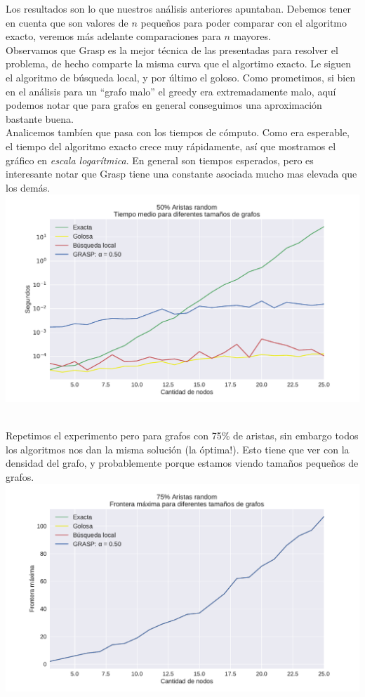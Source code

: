 Los resultados son lo que nuestros análisis anteriores apuntaban. Debemos tener en cuenta que son valores de $n$ pequeños para poder comparar con el algoritmo exacto, veremos más adelante comparaciones para $n$ mayores. \\

Observamos que Grasp es la mejor técnica de las presentadas para resolver el problema, de hecho comparte la misma curva que el algortimo exacto. Le siguen el algoritmo de búsqueda local, y por último el goloso. Como prometimos, si bien en el análisis para un ``grafo malo'' el greedy era extremadamente malo, aquí podemos notar que para grafos en general conseguimos una aproximación bastante buena. \\

Analicemos tambíen que pasa con los tiempos de cómputo. Como era esperable, el tiempo del algoritmo exacto crece muy rápidamente, así que mostramos el gráfico en \textit{escala logarítmica}. En general son tiempos esperados, pero es interesante notar que Grasp tiene una constante asociada mucho mas elevada que los demás. \\

{\centering
    \includegraphics[width=1\textwidth]{informe/imgs/exp_random50_tiempo_todos_v2.pdf}
}
$ $ \newline

Repetimos el experimento pero para grafos con 75\% de aristas, sin embargo todos los algoritmos nos dan la misma solución (la óptima!). Esto tiene que ver con la densidad del grafo, y probablemente porque estamos viendo tamaños pequeños de grafos. \\

{\centering
    \includegraphics[width=1\textwidth]{informe/imgs/exp_random75_frontera_todos_v2.pdf}
}
